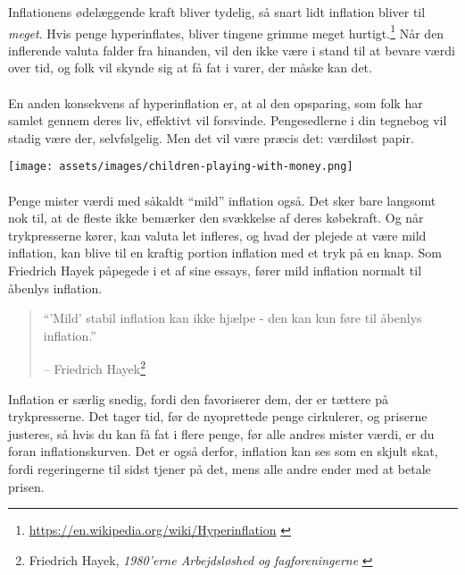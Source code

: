 Inflationens ødelæggende kraft bliver tydelig, så snart lidt inflation bliver 
til \textit{meget}. Hvis penge hyperinflates, bliver tingene grimme meget 
hurtigt.\footnote{\url{https://en.wikipedia.org/wiki/Hyperinflation}
\cite{wiki:hyperinflation}} Når den inflerende valuta falder fra hinanden, 
vil den ikke være i stand til at bevare værdi over tid, og folk vil skynde 
sig at få fat i varer, der måske kan det.

\paragraph{}
En anden konsekvens af hyperinflation er, at al den opsparing, som folk har 
samlet gennem deres liv, effektivt vil forsvinde. Pengesedlerne i din tegnebog 
vil stadig være der, selvfølgelig. Men det vil være præcis det: værdiløst papir.

\begin{center}
\texttt{[image: assets/images/children-playing-with-money.png]}
\label{fig:children-playing-with-money}
\end{center}

\paragraph{}
Penge mister værdi med såkaldt \enquote{mild} inflation også. Det sker bare 
langsomt nok til, at de fleste ikke bemærker den svækkelse af deres købekraft.
Og når trykpresserne kører, kan valuta let infleres, og hvad der plejede at 
være mild inflation, kan blive til en kraftig portion inflation med et tryk på 
en knap. Som Friedrich Hayek påpegede i et af sine essays, fører mild inflation 
normalt til åbenlys inflation.

\begin{quotation}\begin{samepage}
\enquote{'Mild' stabil inflation kan ikke hjælpe - den kan kun føre til åbenlys
inflation.} \begin{flushright} -- Friedrich Hayek\footnote{Friedrich Hayek, 
    \textit{1980'erne Arbejdsløshed og fagforeningerne} \cite{hayek-inflation}}
\end{flushright}\end{samepage}\end{quotation}

Inflation er særlig snedig, fordi den favoriserer dem, der er tættere på 
trykpresserne. Det tager tid, før de nyoprettede penge cirkulerer, og priserne 
justeres, så hvis du kan få fat i flere penge, før alle andres mister værdi, 
er du foran inflationskurven. Det er også derfor, inflation kan ses som en 
skjult skat, fordi regeringerne til sidst tjener på det, mens alle andre ender 
med at betale prisen.

